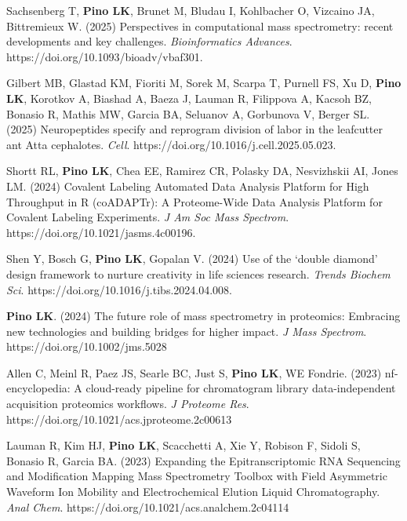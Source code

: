 \documentclass[11pt]{article}
\begin{document}
\begin{etaremune}

    \item Sachsenberg T, \textbf{Pino LK}, Brunet M, Bludau I, Kohlbacher O, Vizcaino JA, Bittremieux W. (2025) Perspectives in computational mass spectrometry: recent developments and key challenges. \textit{Bioinformatics Advances}. https://doi.org/10.1093/bioadv/vbaf301.

    \item Gilbert MB, Glastad KM, Fioriti M, Sorek M, Scarpa T, Purnell FS, Xu D, \textbf{Pino LK}, Korotkov A, Biashad A, Baeza J, Lauman R, Filippova A, Kacsoh BZ, Bonasio R, Mathis MW, Garcia BA, Seluanov A, Gorbunova V, Berger SL. (2025) Neuropeptides specify and reprogram division of labor in the leafcutter ant Atta cephalotes. \textit{Cell}. https://doi.org/10.1016/j.cell.2025.05.023.

    \item Shortt RL, \textbf{Pino LK}, Chea EE, Ramirez CR, Polasky DA, Nesvizhskii AI, Jones LM. (2024) Covalent Labeling Automated Data Analysis Platform for High Throughput in R (coADAPTr): A Proteome-Wide Data Analysis Platform for Covalent Labeling Experiments. \textit{J Am Soc Mass Spectrom}. https://doi.org/10.1021/jasms.4c00196.

    \item Shen Y, Bosch G, \textbf{Pino LK}, Gopalan V. (2024) Use of the `double diamond' design framework to nurture creativity in life sciences research. \textit{Trends Biochem Sci}. https://doi.org/10.1016/j.tibs.2024.04.008.

    \item \textbf{Pino LK}. (2024) The future role of mass spectrometry in proteomics: Embracing new technologies and building bridges for higher impact. 
    \textit{J Mass Spectrom}. https://doi.org/10.1002/jms.5028
    
    \item Allen C, Meinl R, Paez JS, Searle BC, Just S, \textbf{Pino LK}, WE Fondrie. 
    (2023) nf-encyclopedia: A cloud-ready pipeline for chromatogram library 
    data-independent acquisition proteomics workflows. \textit{J Proteome Res}. 
    https://doi.org/10.1021/acs.jproteome.2c00613

    \item Lauman R, Kim HJ, \textbf{Pino LK}, Scacchetti A, Xie Y, Robison F, Sidoli S, 
    Bonasio R, Garcia BA. (2023) Expanding the Epitranscriptomic RNA Sequencing and 
    Modification Mapping Mass Spectrometry Toolbox with Field Asymmetric Waveform Ion 
    Mobility and Electrochemical Elution Liquid Chromatography. \textit{Anal Chem}. 
    https://doi.org/10.1021/acs.analchem.2c04114 


\end{etaremune}
\end{document}
